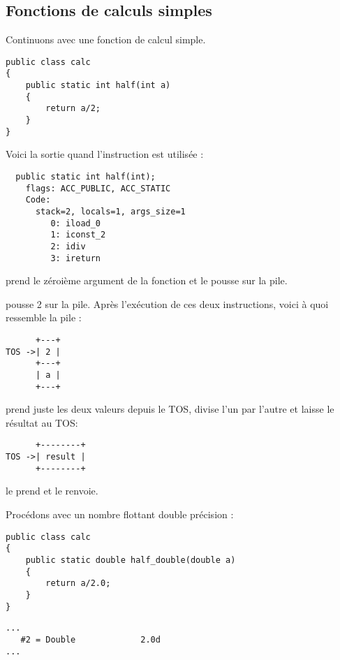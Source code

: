 \subsection{Fonctions de calculs simples}

Continuons avec une fonction de calcul simple.

\begin{lstlisting}[style=customjava]
public class calc
{
	public static int half(int a)
	{
		return a/2;
	}
}
\end{lstlisting}

Voici la sortie quand l'instruction  est utilisée :


\begin{lstlisting}
  public static int half(int);
    flags: ACC_PUBLIC, ACC_STATIC
    Code:
      stack=2, locals=1, args_size=1
         0: iload_0
         1: iconst_2
         2: idiv
         3: ireturn
\end{lstlisting}

 prend le zéroième argument de la fonction et le pousse sur la pile.

 pousse 2 sur la pile.
Après l'exécution de ces deux instructions, voici à quoi ressemble la pile :


\begin{lstlisting}
      +---+
TOS ->| 2 |
      +---+
      | a |
      +---+
\end{lstlisting}

 prend juste les deux valeurs depuis le \ac{TOS}, divise l'un par l'autre et laisse
le résultat au \ac{TOS}:


\begin{lstlisting}
      +--------+
TOS ->| result |
      +--------+
\end{lstlisting}

 le prend et le renvoie.

Procédons avec un nombre flottant double précision :


\begin{lstlisting}[style=customjava]
public class calc
{
	public static double half_double(double a)
	{
		return a/2.0;
	}
}
\end{lstlisting}

\begin{lstlisting}[caption=Constant pool]
...
   #2 = Double             2.0d
...
\end{lstlisting}

